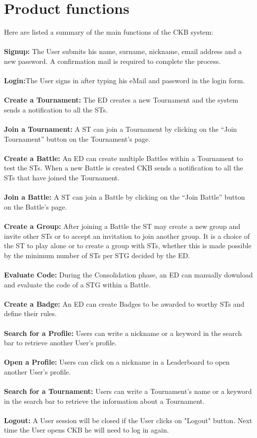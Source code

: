 \section{Product functions}
\label{sec:product_functions}%
Here are listed a summary of the main functions of the CKB system:\\\\
\textbf{ Signup:} The User submits his name, surname, nickname, email address and a new password. A confirmation mail is required to complete the process.\\\\
\textbf{ Login:}The User signs in after typing his eMail and password in the login form. \\\\  
\textbf{ Create a Tournament:} The ED creates a new Tournament and the system sends a notification to all the STs.\\\\
\textbf{ Join a Tournament:} A ST can join a Tournament by clicking on the “Join Tournament” button on the Tournament’s page.\\\\
\textbf{ Create a Battle:} An ED can create multiple Battles within a Tournament to test the STs. When a new Battle is created CKB sends a notification to all the STs that have joined the Tournament.\\\\
\textbf{ Join a Battle:} A ST can join a Battle by clicking on the “Join Battle” button on the Battle’s page.\\\\
\textbf{ Create a Group:} After joining a Battle the ST may create a new group and invite other STs or to accept an invitation to join another group. It is a choice of the ST to play alone or to create a group with STs, whether this is made possible by the minimum number of STs per STG decided by the ED.\\\\
\textbf{ Evaluate Code:} During the Consolidation phase, an ED can manually download and evaluate the code of a STG within a Battle.\\\\
\textbf{ Create a Badge:} An ED can create Badges to be awarded to worthy STs and define their rules.\\\\
\textbf{ Search for a Profile:} Users can write a nickname or a keyword in the search bar to retrieve another User’s profile.\\\\
\textbf{ Open a Profile:} Users can click on a nickname in a Leaderboard to open another User’s profile.\\\\
\textbf{ Search for a Tournament:} Users can write a Tournament's name or a keyword in the search bar to retrieve the information about a Tournament.\\\\
\textbf{ Logout:} A User session will be closed if the User clicks on "Logout" button. Next time the User opens CKB he will need to log in again.


